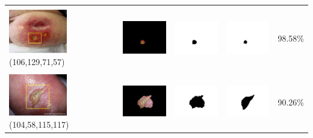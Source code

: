 \begin{table}[H]
\begin{tabular}{|m{1.0in}|m{1.0in}|m{1.0in}|m{1.0in}|m{0.6in}|}
		&  &  & \\
		\includegraphics[width=1.0in]{gambar/hasil_segmentasi/luka_kuning/image_17_rect.jpg} {\centering\fontsize{10}{10}\selectfont(106,129,71,57)}&
		\includegraphics[width=1.0in]{gambar/hasil_segmentasi/luka_kuning/result_17.jpg}&
		\includegraphics[width=1.0in]{gambar/hasil_segmentasi/luka_kuning/mask_r_17.jpg}&
		\includegraphics[width=1.0in]{gambar/hasil_segmentasi/luka_kuning/17_r.jpg}&
		98.58\% \\
		\hline

		&  &  & \\
		\includegraphics[width=1.0in]{gambar/hasil_segmentasi/luka_kuning/image_18_rect.jpg} {\centering\fontsize{10}{10}\selectfont(104,58,115,117)}&
		\includegraphics[width=1.0in]{gambar/hasil_segmentasi/luka_kuning/result_18.jpg}&
		\includegraphics[width=1.0in]{gambar/hasil_segmentasi/luka_kuning/mask_r_18.jpg}&
		\includegraphics[width=1.0in]{gambar/hasil_segmentasi/luka_kuning/18_r.jpg}&
		90.26\% \\
		\hline


\end{tabular}
\end{table}
